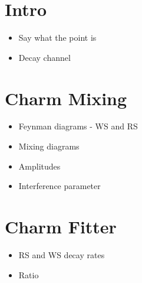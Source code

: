 \documentclass[note.tex]{subfiles}
\begin{document}
\section{Intro}
\begin{itemize}
    \item Say what the point is
    \item Decay channel
\end{itemize}

\section{Charm Mixing}
\begin{itemize}
    \item Feynman diagrams - WS and RS
    \item Mixing diagrams
    \item Amplitudes
    \item Interference parameter
\end{itemize}

\section{Charm Fitter}
\begin{itemize}
    \item RS and WS decay rates
    \item Ratio
\end{itemize}
\end{document}
